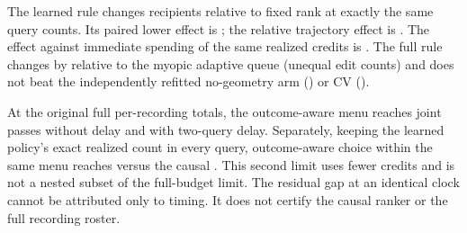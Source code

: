 The learned rule changes \SlateQueueChanged{} recipients relative
to fixed rank at exactly the same query counts. Its paired
lower effect is \SlateQueueMain{}; the relative trajectory
effect is \SlateQueueRelative{}. The effect against immediate
spending of the same realized credits is \SlateQueueImmediate{}.
The full rule changes by \SlateQueueMyopic{} relative to the
myopic adaptive queue (unequal edit counts) and does not beat
the independently refitted no-geometry arm
(\SlateQueueGeometry{}) or CV (\SlateQueueCV{}).

At the original full per-recording totals, the outcome-aware
menu reaches \SlateQueueNoDelay{} joint passes without delay
and \SlateQueueTwoDelay{} with two-query delay. Separately,
keeping the learned policy's exact realized count in every
query, outcome-aware choice within the same menu reaches
\SlateQueueClockCapacity{} versus the causal
\SlateQueueJointPass{}. This second limit uses fewer
credits and is not a nested subset of the full-budget
limit. The residual gap at an identical clock cannot be
attributed only to timing. It does not certify the causal
ranker or the full recording roster.

